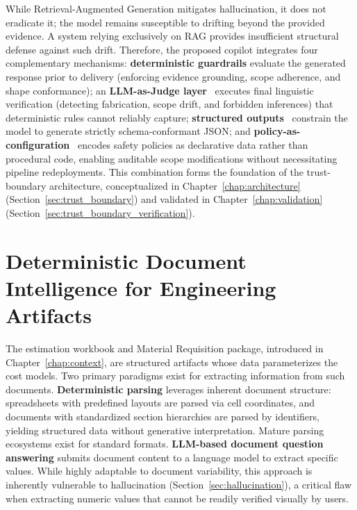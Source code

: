 While Retrieval-Augmented Generation mitigates hallucination, it does not eradicate it; the model remains susceptible to drifting beyond the provided evidence. A system relying exclusively on RAG provides insufficient structural defense against such drift. Therefore, the proposed copilot integrates four complementary mechanisms: \textbf{deterministic guardrails} evaluate the generated response prior to delivery (enforcing evidence grounding, scope adherence, and shape conformance); an \textbf{LLM-as-Judge layer}~\cite{zheng2023judge} executes final linguistic verification (detecting fabrication, scope drift, and forbidden inferences) that deterministic rules cannot reliably capture; \textbf{structured outputs}~\cite{anthropic_structured_outputs_docs} constrain the model to generate strictly schema-conformant JSON; and \textbf{policy-\allowbreak as-\allowbreak configuration}~\cite{bai2022constitutional} encodes safety policies as declarative data rather than procedural code, enabling auditable scope modifications without necessitating pipeline redeployments. This combination forms the foundation of the trust-boundary architecture, conceptualized in Chapter~\ref{chap:architecture} (Section~\ref{sec:trust_boundary}) and validated in Chapter~\ref{chap:validation} (Section~\ref{sec:trust_boundary_verification}).

\section{Deterministic Document Intelligence for Engineering Artifacts}\label{sec:deterministic_intelligence}
The estimation workbook and Material Requisition package, introduced in Chapter~\ref{chap:context}, are structured artifacts whose data parameterizes the cost models. Two primary paradigms exist for extracting information from such documents. \textbf{Deterministic parsing} leverages inherent document structure: spreadsheets with predefined layouts are parsed via cell coordinates, and documents with standardized section hierarchies are parsed by identifiers, yielding structured data without generative interpretation. Mature parsing ecosystems exist for standard formats. \textbf{LLM-based document question answering} submits document content to a language model to extract specific values. While highly adaptable to document variability, this approach is inherently vulnerable to hallucination (Section~\ref{sec:hallucination}), a critical flaw when extracting numeric values that cannot be readily verified visually by users.

